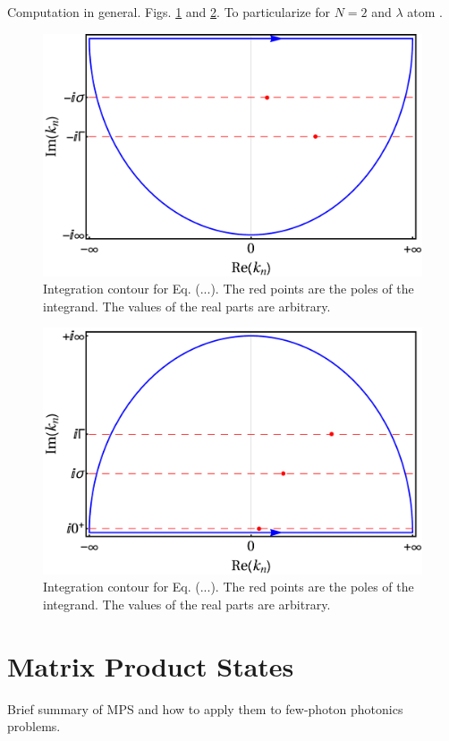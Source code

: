 \documentclass[aps,pra,reprint,amsmath,amssymb]{revtex4-1}
\begin{document}
Computation in general. Figs. \ref{fig:lower} and \ref{fig:upper}. To particularize for $N=2$ and $\lambda$ atom \cite{Xu2016}.

\begin{figure}[tbh!]
\includegraphics[scale=0.25]{lower_contour.pdf}
\caption{Integration contour for Eq. (...). The red points are the poles of the
integrand. The values of the real parts are arbitrary.}
\label{fig:lower}
\end{figure}

\begin{figure}[tbh!]
\includegraphics[scale=0.25]{upper_contour.pdf}
\caption{Integration contour for Eq. (...). The red points are the poles of the
integrand. The values of the real parts are arbitrary.}
\label{fig:upper}
\end{figure}


\section{Matrix Product States}

Brief summary of MPS and how to apply them to few-photon photonics problems.



\end{document}

